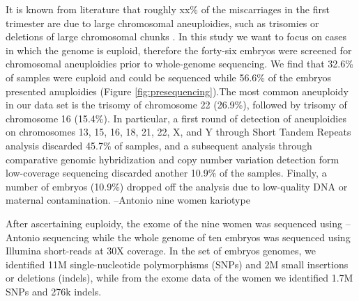 \documentclass[fleqn,10pt]{wlscirep}
\begin{document}
It is known from literature that roughly xx\% of the miscarriages in the first trimester are due to large chromosomal aneuploidies, such as trisomies or deletions of large chromosomal chunks \cite{goddijn2000genetic,zhang2009genetic}. In this study we want to focus on cases in which the genome is euploid, therefore the forty-six embryos were screened for chromosomal aneuploidies prior to whole-genome sequencing. We find that 32.6\% of samples were euploid and could be sequenced while 56.6\% of the embryos presented anuploidies (Figure \ref{fig:presequencing}).The most common aneuploidy in our data set is the trisomy of chromosome 22 (26.9\%), followed by trisomy of chromosome 16 (15.4\%). In particular, a first round of detection of aneuploidies on chromosomes 13, 15, 16, 18, 21, 22, X, and Y through Short Tandem Repeats analysis discarded 45.7\% of samples, %
and a subsequent analysis through comparative genomic hybridization and copy number variation detection form low-coverage sequencing discarded another 10.9\% of the samples. Finally, a number of embryos (10.9\%) dropped off the analysis due to low-quality DNA or maternal contamination. 
{\color{blue}--Antonio nine women kariotype}  

After ascertaining euploidy, the exome of the nine women was sequenced using {\color{blue}--Antonio sequencing} while the whole genome of ten embryos was sequenced using Illumina short-reads at 30X coverage. In the set of embryos genomes, we identified 11M single-nucleotide polymorphisms (SNPs) and 2M small insertions or deletions (indels), while from the exome data of the women we identified 1.7M SNPs and 276k indels.


\end{document}
